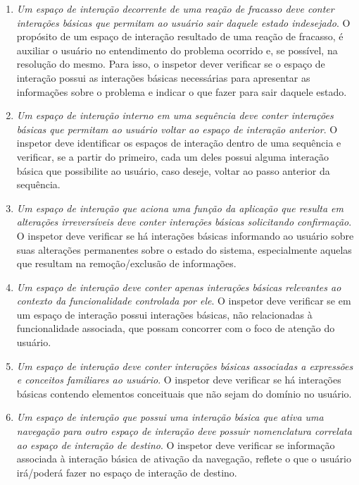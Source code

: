 \begin{enumerate}
  \item  {\em Um  espaço  de  interação decorrente  de  uma reação  de
    fracasso deve  conter interações  básicas que permitam  ao usuário
    sair  daquele estado  indesejado}.  O  propósito de  um  espaço de
    interação  resultado  de uma  reação  de  fracasso,  é auxiliar  o
    usuário no  entendimento do problema  ocorrido e, se  possível, na
    resolução do  mesmo. Para  isso, o inspetor  dever verificar  se o
    espaço de interação possui  as interações básicas necessárias para
    apresentar as informações  sobre o problema e indicar  o que fazer
    para sair daquele estado.

  \item  {\em Um  espaço de  interação interno  em uma  sequência deve
    conter interações básicas que permitam ao usuário voltar ao espaço
    de interação anterior}. O  inspetor deve identificar os espaços de
    interação  dentro de  uma sequência  e verificar,  se a  partir do
    primeiro,  cada  um  deles  possui  alguma  interação  básica  que
    possibilite ao  usuário, caso deseje, voltar ao  passo anterior da
    sequência.

  \item {\em Um espaço de interação que aciona uma função da aplicação
    que  resulta em  alterações irreversíveis  deve  conter interações
    básicas solicitando confirmação}. O  inspetor deve verificar se há
    interações  básicas informando  ao usuário  sobre  suas alterações
    permanentes sobre  o estado do sistema,  especialmente aquelas que
    resultam na remoção/exclusão de informações.
     

  \item  {\em Um  espaço de  interação deve  conter  apenas interações
    básicas  relevantes ao contexto  da funcionalidade  controlada por
    ele}.   O inspetor  deve verificar  se em  um espaço  de interação
    possui  interações  básicas,  não  relacionadas  à  funcionalidade
    associada, que possam concorrer com o foco de atenção do usuário.

  \item  {\em Um espaço  de interação  deve conter  interações básicas
    associadas  a expressões  e conceitos  familiares ao  usuário}.  O
    inspetor  deve   verificar  se  há   interações  básicas  contendo
    elementos conceituais que não sejam do domínio no usuário.
   
  \item {\em  Um espaço de  interação que possui uma  interação básica
    que  ativa  uma navegação  para  outro  espaço  de interação  deve
    possuir nomenclatura correlata ao espaço de interação de destino}.
    O  inspetor deve  verificar  se informação  associada à  interação
    básica  de  ativação  da   navegação,  reflete  o  que  o  usuário
    irá/poderá fazer no espaço de interação de destino.


\end{enumerate}
